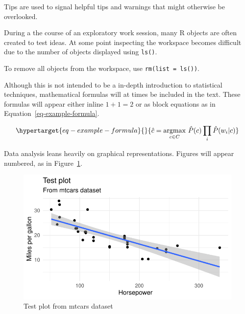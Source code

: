 \documentclass[
  letterpaper,
]{scrbook}
\begin{document}
Tips are used to signal helpful tips and warnings that might otherwise
be overlooked.

\begin{tcolorbox}[enhanced jigsaw, title=\textcolor{quarto-callout-warning-color}{\faExclamationTriangle}\hspace{0.5em}{Tip}, titlerule=0mm, toptitle=1mm, colbacktitle=quarto-callout-warning-color!10!white, bottomtitle=1mm, left=2mm, colframe=quarto-callout-warning-color-frame, breakable, toprule=.15mm, colback=white, opacitybacktitle=0.6, leftrule=.75mm, rightrule=.15mm, bottomrule=.15mm, arc=.35mm, coltitle=black, opacityback=0]

During a the course of an exploratory work session, many R objects are
often created to test ideas. At some point inspecting the workspace
becomes difficult due to the number of objects displayed using
\texttt{ls()}.

To remove all objects from the workspace, use
\texttt{rm(list\ =\ ls())}.

\end{tcolorbox}

Although this is not intended to be a in-depth introduction to
statistical techniques, mathematical formulas will at times be included
in the text. These formulas will appear either inline \(1 + 1 = 2\) or
as block equations as in Equation~\ref{eq-example-formula}.

\begin{equation}\protect\hypertarget{eq-example-formula}{}{
\hat{c} = \underset{c \in C} {\mathrm{argmax}} ~\hat{P}(c) \prod_i \hat{P}(w_i|c)
}\label{eq-example-formula}\end{equation}

Data analysis leans heavily on graphical representations. Figures will
appear numbered, as in Figure~\ref{fig-test-fig}.

\begin{figure}[h]

{\centering \includegraphics{./preface_files/figure-pdf/fig-test-fig-1.pdf}

}

\caption{\label{fig-test-fig}Test plot from mtcars dataset}

\end{figure}
\end{document}
